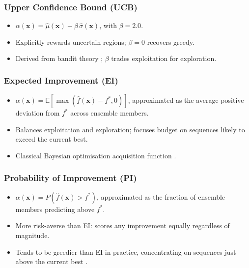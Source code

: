 \subsubsection{Upper Confidence Bound (UCB)}
\begin{itemize}
  \item $\alpha(\mathbf{x}) = \hat{\mu}(\mathbf{x}) + \beta\,\hat{\sigma}(\mathbf{x})$, with $\beta = 2.0$.
  \item Explicitly rewards uncertain regions; $\beta = 0$ recovers greedy.
  \item Derived from bandit theory ; $\beta$ trades exploitation for exploration.
\end{itemize}

\subsubsection{Expected Improvement (EI)}
\begin{itemize}
  \item $\alpha(\mathbf{x}) = \mathbb{E}[\max(\hat{f}(\mathbf{x}) - f^*, 0)]$, approximated as the average positive deviation from $f^*$ across ensemble members.
  \item Balances exploitation and exploration; focuses budget on sequences likely to exceed the current best.
  \item Classical Bayesian optimisation acquisition function .
\end{itemize}

\subsubsection{Probability of Improvement (PI)}
\begin{itemize}
  \item $\alpha(\mathbf{x}) = P(\hat{f}(\mathbf{x}) > f^*)$, approximated as the fraction of ensemble members predicting above $f^*$.
  \item More risk-averse than EI: scores any improvement equally regardless of magnitude.
  \item Tends to be greedier than EI in practice, concentrating on sequences just above the current best .
\end{itemize}

